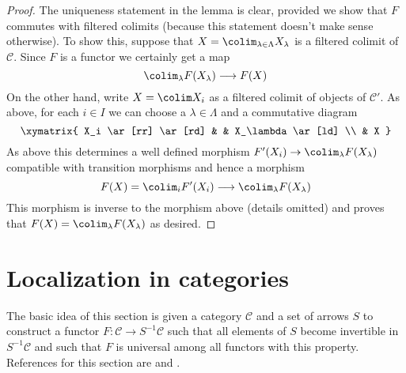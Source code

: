 \begin{proof}
\medskip\noindent
The uniqueness statement in the lemma is clear, provided
we show that $F$ commutes with filtered colimits (because this
statement doesn't make sense otherwise). To show this, suppose that
$X = \colim_{\lambda \in \Lambda} X_\lambda$
is a filtered colimit of $\mathcal{C}$. Since $F$ is a functor
we certainly get a map
$$
\colim_\lambda F(X_\lambda) \longrightarrow F(X)
$$
On the other hand, write $X = \colim X_i$
as a filtered colimit of objects of $\mathcal{C}'$. 
As above, for each $i \in I$ we can choose a $\lambda \in \Lambda$
and a commutative diagram
$$
\xymatrix{
X_i \ar[rr] \ar[rd] & & X_\lambda \ar[ld] \\
& X
}
$$
As above this determines a well defined morphism
$F'(X_i) \to \colim_\lambda F(X_\lambda)$ compatible
with transition morphisms and hence a morphism
$$
F(X) = \colim_i F'(X_i) \longrightarrow \colim_\lambda F(X_\lambda)
$$
This morphism is inverse to the morphism above (details omitted)
and proves that $F(X) = \colim_\lambda F(X_\lambda)$ as desired.
\end{proof}







\section{Localization in categories}
\label{section-localization}

\noindent
The basic idea of this section is given a category $\mathcal{C}$
and a set of arrows $S$ to construct a functor
$F : \mathcal{C} \to S^{-1}\mathcal{C}$
such that all elements of $S$ become invertible in $S^{-1}\mathcal{C}$
and such that $F$ is universal among all functors with this property.
References for this section are \cite[Chapter I, Section 2]{GZ}
and \cite[Chapter II, Section 2]{Verdier}.

